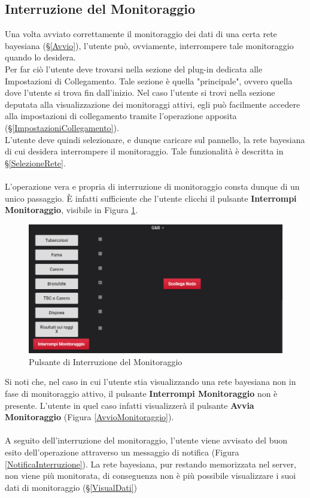 \subsection{Interruzione del Monitoraggio}\label{Interruzione}

Una volta avviato correttamente il monitoraggio dei dati di una certa rete bayesiana (§\ref{Avvio}), l'utente può, ovviamente, interrompere tale monitoraggio quando lo desidera.\\
Per far ciò l'utente deve trovarsi nella sezione del plug-in dedicata alle Impostazioni di Collegamento. Tale sezione è quella "principale", ovvero quella dove l'utente si trova fin dall'inizio. Nel caso l'utente si trovi nella sezione deputata alla visualizzazione dei monitoraggi attivi, egli può facilmente accedere alla impostazioni di collegamento tramite l'operazione apposita (§\ref{ImpostazioniCollegamento}).\\
L'utente deve quindi selezionare, e dunque caricare sul pannello, la rete bayesiana di cui desidera interrompere il monitoraggio. Tale funzionalità è descritta in §\ref{SelezioneRete}.\\
~\\
L'operazione vera e propria di interruzione di monitoraggio consta dunque di un unico passaggio. È infatti sufficiente che l'utente clicchi il pulsante \textbf{Interrompi Monitoraggio}, visibile in Figura \ref{InterruzioneMonitoraggio}.

\begin{figure}[H]
	\begin{center}
		\includegraphics[scale=0.7]{./images/InterruzioneMonitoraggio.png}
		 \caption{Pulsante di Interruzione del Monitoraggio}	
		 \label{InterruzioneMonitoraggio}
	\end{center}
\end{figure}

Si noti che, nel caso in cui l'utente stia visualizzando una rete bayesiana non in fase di monitoraggio attivo, il pulsante \textbf{Interrompi Monitoraggio} non è presente. L'utente in quel caso infatti visualizzerà il pulsante \textbf{Avvia Monitoraggio} (Figura \ref{AvvioMonitoraggio}).\\
~\\
A seguito dell'interruzione del monitoraggio, l'utente viene avvisato del buon esito dell'operazione attraverso un messaggio di notifica (Figura \ref{NotificaInterruzione}). La rete bayesiana, pur restando memorizzata nel server, non viene più monitorata, di conseguenza non è più possibile visualizzare i suoi dati di monitoraggio (§\ref{VisualDati})

